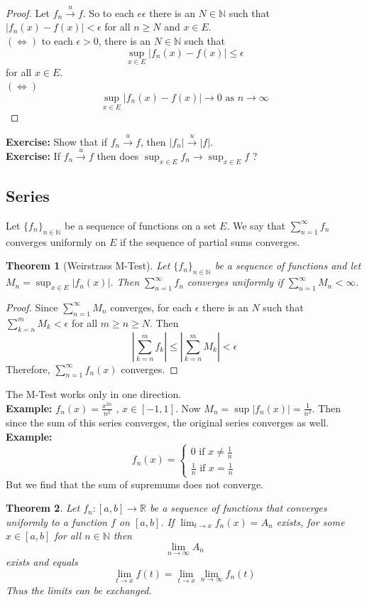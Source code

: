 \documentclass{article}
\newtheorem{theorem}{Theorem}
\begin{document}
\begin{proof}
    Let $f_n\xrightarrow{u}f$. So to each $e\epsilon$ there is an $N\in\mathbb{N}$ such that $|f_n(x)-f(x)|<\epsilon$ for all $n\geq N$ and $x\in E$. \\
     $(\iff)$ to each $\epsilon>0$, there is an $N\in\mathbb{N}$ such that
    $$\sup_{x\in E}|f_n(x)-f(x)|\leq \epsilon$$ for all $x\in E$.\\
    $(\iff)$ $$\sup_{x\in E}|f_n(x)-f(x)|\to 0 \text{ as }n\to \infty$$
\end{proof}
\textbf{Exercise: }Show that if $f_n\xrightarrow{u}f$, then $|f_n|\xrightarrow{u}|f|$.\\
\textbf{Exercise: }If $f_n\xrightarrow{u}f$ then does $\sup_{x\in E}f_n\to\sup_{x\in E}f$ ?
\subsection*{Series}
Let $\{f_n\}_{n\in\mathbb{N}}$ be a sequence of functions on a set $E$. We say that $\sum_{n=1}^{\infty}f_n$ converges uniformly on $E$ if the sequence of partial sums converges.
\begin{theorem}[Weirstrass M-Test]
    Let $\{f_n\}_{n\in\mathbb{N}}$ be a sequence of functions and let $M_n=\sup_{x\in E}|f_n(x)|$. Then $\sum_{n=1}^{\infty}f_n$ converges uniformly if $\sum_{n=1}^{\infty}M_n<\infty$. 
\end{theorem}
\begin{proof}
    Since $\sum_{n=1}^{\infty}M_n$ converges, for each $\epsilon$ there is an $N$ such that $\sum_{k=n}^{m}M_k<\epsilon$ for all $m\geq n\geq N$. Then 
    $$|\sum_{k=n}^{m}f_k|\leq |\sum_{k=n}^{m}M_k|<\epsilon$$
    Therefore, $\sum_{n=1}^{\infty}f_n(x)$ converges. 
\end{proof}
The M-Test works only in one direction.\\
\textbf{Example:} $f_n(x)=\frac{x^{2n}}{n^2}$ , $x\in [-1,1]$. Now $M_n=\sup |f_n(x)|=\frac{1}{n^2}$. Then since the sum of this series converges, the original series converges as well.\\
\textbf{Example:} $$f_n(x)=
\begin{cases}
0 \text{ if }x\neq \frac{1}{n}\\
\frac{1}{n} \text{ if }x=\frac{1}{n}
\end{cases}
$$
But we find that the sum of supremums does not converge. 
\begin{theorem}
    Let $f_n:[a,b]\to \mathbb{R}$ be a sequence of functions that converges uniformly to a function $f$ on $[a,b]$. 
If $\lim_{t\to x}f_n(x)=A_n$ exists, for some $x\in [a,b]$ for all $n\in\mathbb{N}$ then 
$$\lim_{n\to\infty}A_n$$
exists and equals 
$$\lim_{t\to x }f(t)=\lim_{t\to x}\lim_{n\to\infty}f_n(t)$$
Thus the limits can be exchanged.
\end{theorem}
\end{document}
